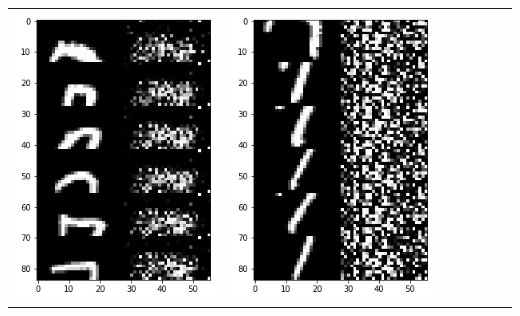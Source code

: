 \documentclass[12pt]{report} %
\begin{document}
\begin{tabular}{m{0.7cm}m{2.4cm}m{2.4cm}m{2.4cm}m{2.4cm}m{2.4cm}m{2.4cm}}
\includegraphics[scale=0.3]{pictures/M2_7_up.png} & \includegraphics[scale=0.3]{pictures/M2_7_down.png}\\

\end{tabular}
\end{document}
